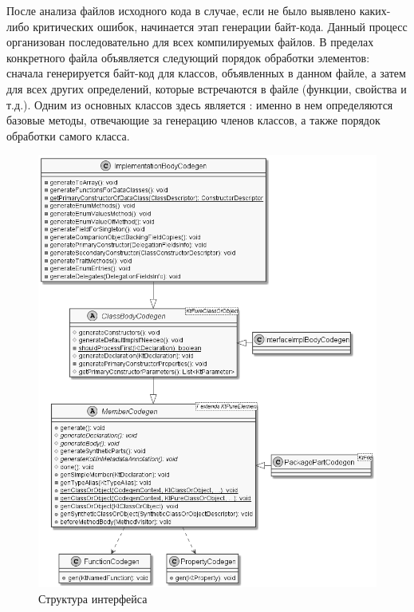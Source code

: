 После анализа файлов исходного кода в случае, если не было выявлено каких-либо критических ошибок, начинается этап генерации байт-кода. Данный процесс организован последовательно для всех компилируемых файлов. В пределах конкретного файла объявляется следующий порядок обработки элементов: сначала генерируется байт-код для классов, объявленных в данном файле, а затем для всех других определений, которые встречаются в файле (функции, свойства и т.д.). Одним из основных классов здесь является : именно в нем определяются базовые методы, отвечающие за генерацию членов классов, а также порядок обработки самого класса. 

\begin{figure}[htbp]
    \centering
    \includegraphics[width=\textwidth]{resources/06/06_member_codegen.png}
    \caption{Структура интерфейса }
    \label{fig:binding-trace-scheme}
\end{figure}

